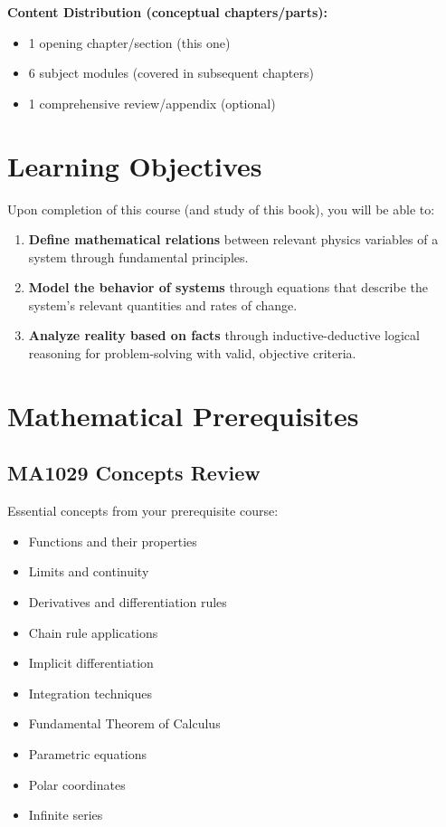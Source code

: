 \documentclass[12pt, letterpaper]{book}
\begin{document}
\textbf{Content Distribution (conceptual chapters/parts):}
\begin{itemize}
    \item 1 opening chapter/section (this one)
    \item 6 subject modules (covered in subsequent chapters)
    \item 1 comprehensive review/appendix (optional)
\end{itemize}

\section{Learning Objectives}
\label{sec:learning_objectives}
Upon completion of this course (and study of this book), you will be able to:

\begin{enumerate}
    \item \textbf{Define mathematical relations} between relevant physics variables of a system through fundamental principles.
    \item \textbf{Model the behavior of systems} through equations that describe the system's relevant quantities and rates of change.
    \item \textbf{Analyze reality based on facts} through inductive-deductive logical reasoning for problem-solving with valid, objective criteria.
\end{enumerate}

\section{Mathematical Prerequisites}
\label{sec:math_prereqs}

\subsection{MA1029 Concepts Review}
\label{ssec:ma1029_review}
Essential concepts from your prerequisite course:

\begin{multicols}{2}
\begin{itemize}
    \item Functions and their properties
    \item Limits and continuity
    \item Derivatives and differentiation rules
    \item Chain rule applications
    \item Implicit differentiation
    \item Integration techniques
    \item Fundamental Theorem of Calculus
    \item Parametric equations
    \item Polar coordinates
    \item Infinite series
\end{itemize}
\end{multicols}
\end{document}

